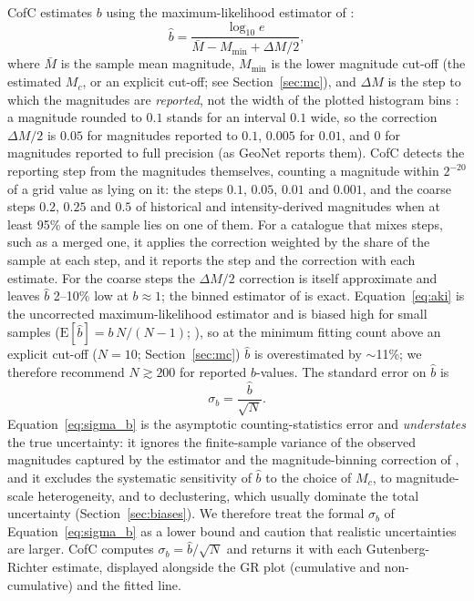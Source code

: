 \documentclass[12pt]{article}
\begin{document}
CofC estimates $b$ using the maximum-likelihood estimator of
\citet{aki1965,utsu1965}:
\begin{equation}
  \hat{b} = \frac{\log_{10} e}{\bar{M} - M_{\min} + \Delta M / 2},
  \label{eq:aki}
\end{equation}
where $\bar{M}$ is the sample mean magnitude, $M_{\min}$ is the lower
magnitude cut-off (the estimated $M_c$, or an explicit cut-off; see
Section~\ref{sec:mc}), and $\Delta M$ is the step to which the magnitudes are
\emph{reported}, not the width of the plotted histogram bins
\citep{bender1983}: a magnitude rounded to $0.1$ stands for an interval
$0.1$ wide, so the correction $\Delta M/2$ is $0.05$ for magnitudes reported to
$0.1$, $0.005$ for $0.01$, and $0$ for magnitudes reported to full precision (as
GeoNet reports them).  CofC detects the reporting step from the magnitudes
themselves, counting a magnitude within $2^{-20}$ of a grid value as lying on
it: the steps $0.1$, $0.05$, $0.01$ and $0.001$, and the coarse steps $0.2$,
$0.25$ and $0.5$ of historical and intensity-derived magnitudes when at least
95\% of the sample lies on one of them.  For a catalogue that mixes steps, such
as a merged one, it applies the correction weighted by the share of the sample
at each step, and it reports the step and the correction with each estimate.
For the coarse steps the $\Delta M/2$ correction is itself approximate and leaves
$\hat{b}$ 2--10\% low at $b \approx 1$; the binned estimator of
\citet{bender1983} is exact.  Equation~\eqref{eq:aki} is the
uncorrected maximum-likelihood estimator and is biased high for small samples
($\mathrm{E}[\hat{b}] = b\,N/(N-1)$; \citealp{marzocchi2003}), so at the minimum
fitting count above an explicit cut-off ($N=10$; Section~\ref{sec:mc}) $\hat{b}$ is
overestimated by $\sim$11\%; we therefore recommend $N \gtrsim 200$ for reported
$b$-values.  The
standard error on $\hat{b}$ is \citep{aki1965}
\begin{equation}
  \sigma_b = \frac{\hat{b}}{\sqrt{N}}.
  \label{eq:sigma_b}
\end{equation}
Equation~\eqref{eq:sigma_b} is the asymptotic counting-statistics error and
\emph{understates} the true uncertainty: it ignores the finite-sample variance
of the observed magnitudes captured by the \citet{shibolt1982} estimator and the
magnitude-binning correction of \citet{bender1983}, and it excludes the
systematic sensitivity of $\hat{b}$ to the choice of $M_c$, to magnitude-scale
heterogeneity, and to declustering, which usually dominate the total
uncertainty (Section~\ref{sec:biases}).  We therefore treat the
formal $\sigma_b$ of Equation~\eqref{eq:sigma_b} as a lower bound and caution that
realistic uncertainties are larger.  CofC computes $\sigma_b = \hat{b}/\sqrt{N}$
and returns it with each Gutenberg-Richter estimate, displayed alongside the GR
plot (cumulative and non-cumulative) and the fitted line.
\end{document}

